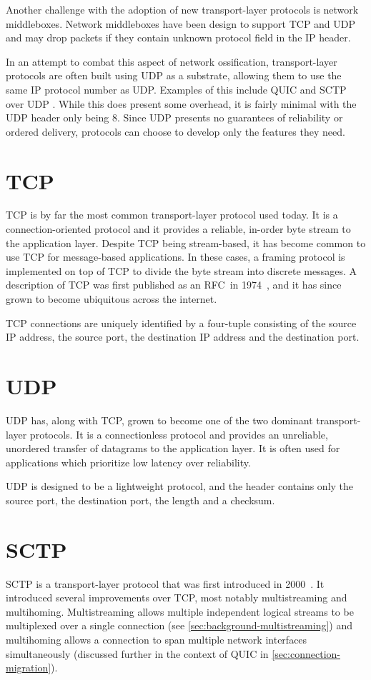 Another challenge with the adoption of new transport-layer protocols
is network middleboxes. Network middleboxes have been
design to support TCP and UDP and may
drop packets if they contain unknown protocol field in the IP header.

In an attempt to combat this aspect of network ossification, transport-layer protocols are often built
using UDP as a substrate, allowing them to use the same IP
protocol number as UDP. Examples of this include QUIC \cite{rfc9000} and
SCTP over UDP \cite{rfc6951}.
While this does present some overhead,
it is fairly minimal with the UDP header only being \qty{8}{\Bytes}.
Since UDP presents no guarantees of reliability or ordered
delivery, protocols can choose to develop only the features they need.

\section{TCP}
TCP is by far the most common transport-layer protocol used 
today. It is a connection-oriented protocol and it provides
a reliable, in-order byte stream to the application layer.
Despite TCP being stream-based, it has become common to
use TCP for message-based applications.
In these cases, a framing protocol is
implemented on top of TCP to divide the byte stream into
discrete messages. A description of TCP was first published as an RFC~in 1974~\cite{rfc675},
and it has since grown to become ubiquitous across the internet.

TCP connections are uniquely identified by a four-tuple consisting
of the source IP address, the source port, the destination IP address
and the destination port.

\section{UDP}
UDP has, along with TCP, grown to become one of the two dominant
transport-layer protocols. It is a connectionless
protocol and provides an unreliable, unordered transfer of datagrams
to the application layer. It is often used for applications which
prioritize low latency over reliability.

UDP is designed to be a lightweight protocol, and the header contains
only the source port, the destination port, the length and a checksum.

\section{SCTP}
SCTP is a transport-layer protocol that was first introduced in 2000~\cite{rfc2960}.
It introduced several improvements over TCP, most notably multistreaming and multihoming.
Multistreaming allows multiple independent logical streams to be multiplexed over a
single connection (see \cref{sec:background-multistreaming})
and multihoming allows a connection to span multiple network interfaces simultaneously (discussed further in the context of QUIC in \cref{sec:connection-migration}).

